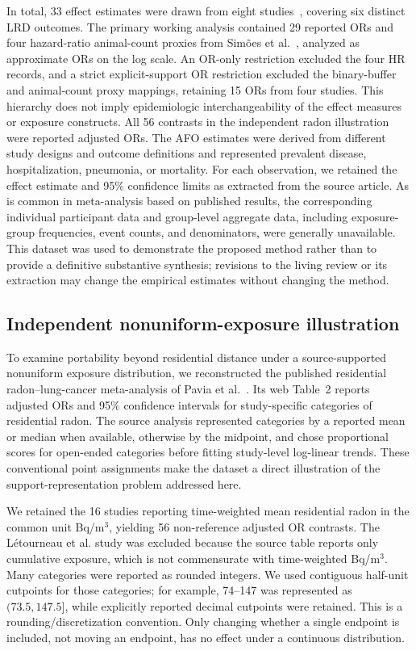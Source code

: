 \documentclass[journal=rsm]{CUP-JNL-DTM}%
\theoremstyle{definition}
\numberwithin{equation}{section}
\begin{document}
In total, 33 effect estimates were drawn from eight studies~\cite{Rasmussen2017, Smit2014, Smit2012, Freidl2017, Schultz2019, Post2019, Son2021, Simoes2022}, covering six distinct LRD outcomes. The primary working analysis contained 29 reported ORs and four hazard-ratio animal-count proxies from Sim\~oes et al.~\cite{Simoes2022}, analyzed as approximate ORs on the log scale. An OR-only restriction excluded the four HR records, and a strict explicit-support OR restriction excluded the binary-buffer and animal-count proxy mappings, retaining 15 ORs from four studies. This hierarchy does not imply epidemiologic interchangeability of the effect measures or exposure constructs. All 56 contrasts in the independent radon illustration were reported adjusted ORs. The AFO estimates were derived from different study designs and outcome
definitions and represented prevalent disease, hospitalization, pneumonia, or mortality. For each observation, we retained the effect estimate and 95\% confidence limits as extracted from the source article. As is common in meta-analysis based on published results, the corresponding
individual participant data and group-level aggregate data, including
exposure-group frequencies, event counts, and denominators, were generally
unavailable. This dataset was used to demonstrate the proposed method rather than to provide a definitive substantive synthesis; revisions to the living review or its extraction may change the empirical estimates without changing the method.

\subsection{Independent nonuniform-exposure illustration}
\label{sec:radon_methods}

To examine portability beyond residential distance under a source-supported
nonuniform exposure distribution, we reconstructed the published residential
radon--lung-cancer meta-analysis of Pavia et al.~\cite{Pavia2003}. Its web
Table~2 reports adjusted ORs and 95\% confidence intervals for study-specific
categories of residential radon. The source analysis represented categories
by a reported mean or median when available, otherwise by the midpoint, and
chose proportional scores for open-ended categories before fitting study-level
log-linear trends. These conventional point assignments make the dataset a
direct illustration of the support-representation problem addressed here.

We retained the 16 studies reporting time-weighted mean residential radon in
the common unit Bq/m$^3$, yielding 56 non-reference adjusted OR contrasts. The
L\'etourneau et al. study was excluded because the source table reports only
cumulative exposure, which is not commensurate with time-weighted Bq/m$^3$.
Many categories were reported as rounded integers. We used contiguous
half-unit cutpoints for those categories; for example, 74--147 was represented
as $(73.5,147.5]$, while explicitly reported decimal cutpoints were retained.
This is a rounding/discretization convention. Only changing whether a single
endpoint is included, not moving an endpoint, has no effect under a continuous
distribution.
\end{document}
